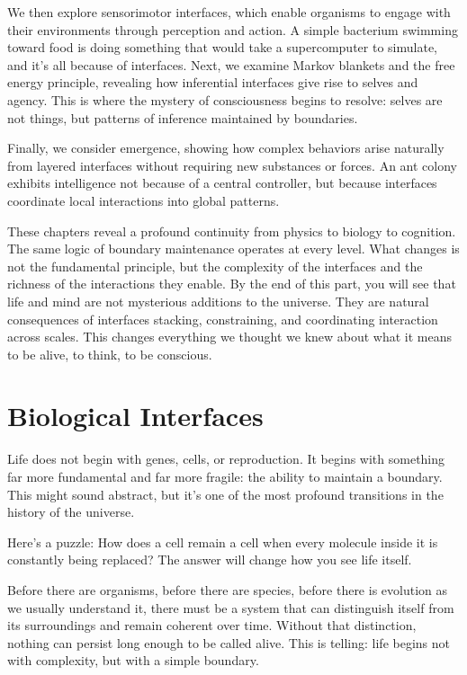 \documentclass[
  openright]{book}
\begin{document}
We then explore sensorimotor interfaces, which enable organisms to
engage with their environments through perception and action. A simple
bacterium swimming toward food is doing something that would take a
supercomputer to simulate, and it's all because of interfaces. Next, we
examine Markov blankets and the free energy principle, revealing how
inferential interfaces give rise to selves and agency. This is where the
mystery of consciousness begins to resolve: selves are not things, but
patterns of inference maintained by boundaries.

Finally, we consider emergence, showing how complex behaviors arise
naturally from layered interfaces without requiring new substances or
forces. An ant colony exhibits intelligence not because of a central
controller, but because interfaces coordinate local interactions into
global patterns.

These chapters reveal a profound continuity from physics to biology to
cognition. The same logic of boundary maintenance operates at every
level. What changes is not the fundamental principle, but the complexity
of the interfaces and the richness of the interactions they enable. By
the end of this part, you will see that life and mind are not mysterious
additions to the universe. They are natural consequences of interfaces
stacking, constraining, and coordinating interaction across scales. This
changes everything we thought we knew about what it means to be alive,
to think, to be conscious.

\chapter{\texorpdfstring{Biological
Interfaces}{Biological Interfaces}}\label{biological-interfaces}

Life does not begin with genes, cells, or reproduction. It begins with
something far more fundamental and far more fragile: the ability to
maintain a boundary. This might sound abstract, but it's one of the most
profound transitions in the history of the universe.

Here's a puzzle: How does a cell remain a cell when every molecule
inside it is constantly being replaced? The answer will change how you
see life itself.

Before there are organisms, before there are species, before there is
evolution as we usually understand it, there must be a system that can
distinguish itself from its surroundings and remain coherent over time.
Without that distinction, nothing can persist long enough to be called
alive. This is telling: life begins not with complexity, but with a
simple boundary.
\end{document}

